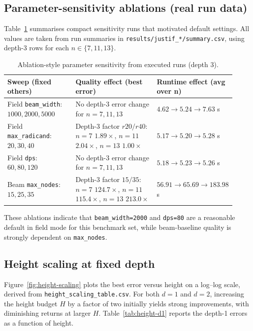\documentclass[11pt]{article}
\begin{document}
\subsection{Parameter-sensitivity ablations (real run data)}

Table~\ref{tab:ablations} summarises compact sensitivity runs that motivated default settings.
All values are taken from run summaries in \texttt{results/justif\_*/\allowbreak *summary.csv}, using depth-3 rows for each $n\in\{7,11,13\}$.

\begin{table}[t]
  \centering
  \caption{Ablation-style parameter sensitivity from executed runs (depth 3).}
  \label{tab:ablations}
  \begin{tabular}{p{0.30\linewidth}p{0.36\linewidth}p{0.26\linewidth}}
    \toprule
    Sweep (fixed others) & Quality effect (best error) & Runtime effect (avg over n) \\
    \midrule
    Field \texttt{beam\_width}: $1000,2000,5000$ & No depth-3 error change for $n=7,11,13$ & $4.62\rightarrow5.24\rightarrow7.63$ s \\
    Field \texttt{max\_radicand}: $20,30,40$ & Depth-3 factor $r20/r40$: $n=7$ $1.89\times$, $n=11$ $2.04\times$, $n=13$ $1.00\times$ & $5.17\rightarrow5.20\rightarrow5.28$ s \\
    Field \texttt{dps}: $60,80,120$ & No depth-3 error change for $n=7,11,13$ & $5.18\rightarrow5.23\rightarrow5.26$ s \\
    Beam \texttt{max\_nodes}: $15,25,35$ & Depth-3 factor $15/35$: $n=7$ $124.7\times$, $n=11$ $115.4\times$, $n=13$ $213.0\times$ & $56.91\rightarrow65.69\rightarrow183.98$ s \\
    \bottomrule
  \end{tabular}
\end{table}

These ablations indicate that \texttt{beam\_width=2000} and \texttt{dps=80} are a reasonable default in field mode for this benchmark set, while beam-baseline quality is strongly dependent on \texttt{max\_nodes}.

\subsection{Height scaling at fixed depth}

Figure~\ref{fig:height-scaling} plots the best error versus height on a log--log scale, derived from \texttt{height\_scaling\_table.csv}.
For both $d=1$ and $d=2$, increasing the height budget $H$ by a factor of two initially yields strong improvements, with diminishing returns at larger $H$.
Table~\ref{tab:height-d1} reports the depth-1 errors as a function of height.
\end{document}
